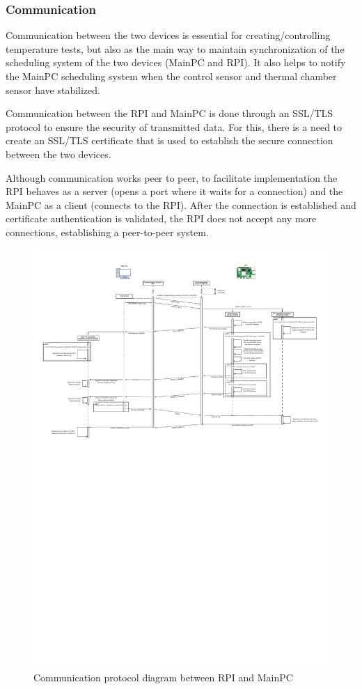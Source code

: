 \subsubsection{Communication}     \label{sec:comunicacao}

Communication between the two devices is essential for creating/controlling temperature tests, but also as the main way to maintain synchronization of the scheduling system of the two devices (MainPC and RPI). It also helps to notify the MainPC scheduling system when the control sensor and thermal chamber sensor have stabilized.

Communication between the RPI and MainPC is done through an SSL/TLS protocol to ensure the security of transmitted data. For this, there is a need to create an SSL/TLS certificate that is used to establish the secure connection between the two devices.

Although communication works peer to peer, to facilitate implementation the RPI behaves as a server (opens a port where it waits for a connection) and the MainPC as a client (connects to the RPI). After the connection is established and certificate authentication is validated, the RPI does not accept any more connections, establishing a peer-to-peer system.

\begin{figure}[H]
    \centering
    \includegraphics[width=\textwidth, clip, trim=0 16cm 0 0]{figures/communication.pdf}
    \caption{Communication protocol diagram between RPI and MainPC}
    \label{fig:diagrama_comunicacao}
\end{figure}

